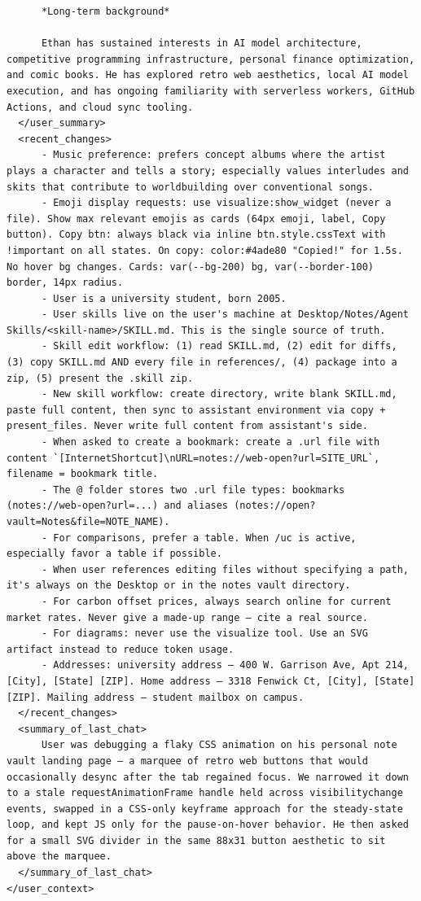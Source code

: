 \documentclass[10pt,letterpaper,twocolumn]{article}
\begin{document}
\begin{promptbox}
\begin{Verbatim}
      *Long-term background*

      Ethan has sustained interests in AI model architecture, competitive programming infrastructure, personal finance optimization, and comic books. He has explored retro web aesthetics, local AI model execution, and has ongoing familiarity with serverless workers, GitHub Actions, and cloud sync tooling.
  </user_summary>
  <recent_changes>
      - Music preference: prefers concept albums where the artist plays a character and tells a story; especially values interludes and skits that contribute to worldbuilding over conventional songs.
      - Emoji display requests: use visualize:show_widget (never a file). Show max relevant emojis as cards (64px emoji, label, Copy button). Copy btn: always black via inline btn.style.cssText with !important on all states. On copy: color:#4ade80 "Copied!" for 1.5s. No hover bg changes. Cards: var(--bg-200) bg, var(--border-100) border, 14px radius.
      - User is a university student, born 2005.
      - User skills live on the user's machine at Desktop/Notes/Agent Skills/<skill-name>/SKILL.md. This is the single source of truth.
      - Skill edit workflow: (1) read SKILL.md, (2) edit for diffs, (3) copy SKILL.md AND every file in references/, (4) package into a zip, (5) present the .skill zip.
      - New skill workflow: create directory, write blank SKILL.md, paste full content, then sync to assistant environment via copy + present_files. Never write full content from assistant's side.
      - When asked to create a bookmark: create a .url file with content `[InternetShortcut]\nURL=notes://web-open?url=SITE_URL`, filename = bookmark title.
      - The @ folder stores two .url file types: bookmarks (notes://web-open?url=...) and aliases (notes://open?vault=Notes&file=NOTE_NAME).
      - For comparisons, prefer a table. When /uc is active, especially favor a table if possible.
      - When user references editing files without specifying a path, it's always on the Desktop or in the notes vault directory.
      - For carbon offset prices, always search online for current market rates. Never give a made-up range — cite a real source.
      - For diagrams: never use the visualize tool. Use an SVG artifact instead to reduce token usage.
      - Addresses: university address — 400 W. Garrison Ave, Apt 214, [City], [State] [ZIP]. Home address — 3318 Fenwick Ct, [City], [State] [ZIP]. Mailing address — student mailbox on campus.
  </recent_changes>
  <summary_of_last_chat>
      User was debugging a flaky CSS animation on his personal note vault landing page — a marquee of retro web buttons that would occasionally desync after the tab regained focus. We narrowed it down to a stale requestAnimationFrame handle held across visibilitychange events, swapped in a CSS-only keyframe approach for the steady-state loop, and kept JS only for the pause-on-hover behavior. He then asked for a small SVG divider in the same 88x31 button aesthetic to sit above the marquee.
  </summary_of_last_chat>
</user_context>


\end{Verbatim}
\end{promptbox}
\end{document}
